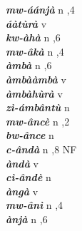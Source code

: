 \begin{multicols}{2}
\noindent
{{\bfseries\itshape mw-áánjà}} \relax  n  ,4  \relax   \relax  \\
{{\bfseries\itshape áàtùrà}} \relax  v  \relax   \relax  {} \relax   \relax  \\
{{\bfseries\itshape kw-àhà}} \relax  n  ,6  \relax   \relax  \\
{{\bfseries\itshape mw-âkà}} \relax  n  ,4  \relax   \relax  \\
{{\bfseries\itshape àmbà}} \relax  n  ,6  \relax   \relax  \\
{{\bfseries\itshape àmbààmbà}} \relax  v  \relax   \relax  {} \relax   \relax  \\
{{\bfseries\itshape àmbàhùrà}} \relax  v  \relax   \relax  {} \relax   \relax  \\
{{\bfseries\itshape zì-ámbântù}} \relax  n   \relax  {} \relax   \relax  \\
{{\bfseries\itshape mw-âncè}} \relax  n  ,2  \relax   \relax  \\
{{\bfseries\itshape bw-ânce}} \relax  n   \relax  {} \relax   \relax  \\
{{\bfseries\itshape c-ândà}} \relax  n  ,8  \relax  NF \relax  \\
{{\bfseries\itshape àndà}} \relax  v  \relax   \relax  {} \relax   \relax  \\
{{\bfseries\itshape cì-ândè}} \relax  n   \relax  {} \relax   \relax  \\
{{\bfseries\itshape àngà}} \relax  v  \relax   \relax  {} \relax   \relax  \\
{{\bfseries\itshape mw-ânì}} \relax  n  ,4  \relax   \relax  \\
{{\bfseries\itshape ànjà}} \relax  n  ,6  \relax   \relax  \\

\end{multicols}
